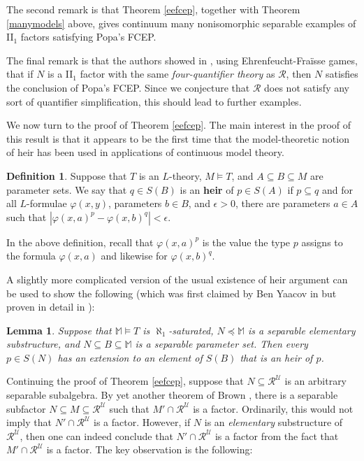 \documentclass[12pt]{amsart}
\newtheorem{lem}[thm]{Lemma}
\theoremstyle{definition}
\newtheorem{defn}[thm]{Definition}
\def\bb{\mathbb}
\def\bb{\mathbb}
\def\u{\mathsf 1}
\def \R{\mathcal R}
\def \u{\mathcal U}
\begin{document}
The second remark is that Theorem \ref{eefcep}, together with Theorem \ref{manymodels} above, gives continuum many nonisomorphic separable examples of II$_1$ factors satisfying Popa's FCEP.

The final remark is that the authors showed in \cite{few}, using Ehrenfeucht-Fra\"isse games, that if $N$ is a II$_1$ factor with the same \emph{four-quantifier theory} as $\R$, then $N$ satisfies the conclusion of Popa's FCEP.  Since we conjecture that $\R$ does not satisfy any sort of quantifier simplification, this should lead to further examples.

We now turn to the proof of Theorem \ref{eefcep}.  The main interest in the proof of this result is that it appears to be the first time that the model-theoretic notion of heir has been used in applications of continuous model theory.

\begin{defn}
Suppose that $T$ is an $L$-theory, $M\models T$, and $A\subseteq B\subseteq M$ are parameter sets.  We say that $q\in S(B)$ is an \textbf{heir} of $p\in S(A)$ if $p\subseteq q$ and for all $L$-formulae $\varphi(x,y)$, parameters $b\in B$, and $\epsilon>0$, there are parameters $a\in A$ such that $|\varphi(x,a)^p-\varphi(x,b)^q|<\epsilon$.
\end{defn}

In the above definition, recall that $\varphi(x,a)^p$ is the value the type $p$ assigns to the formula $\varphi(x,a)$ and likewise for $\varphi(x,b)^q$.

A slightly more complicated version of the usual existence of heir argument can be used to show the following (which was first claimed by Ben Yaacov in \cite{ben} but proven in detail in \cite[Fact 2.2.6]{AGK}):

\begin{lem}
Suppose that $\bb M\models T$ is $\aleph_1$-saturated, $N\preceq \bb M$ is a separable elementary substructure, and $N\subseteq B\subseteq \bb M$ is a separable parameter set.  Then every $p\in S(N)$ has an extension to an element of $S(B)$ that is an heir of $p$. 
\end{lem}

Continuing the proof of Theorem \ref{eefcep}, suppose that $N\subseteq \R^\u$ is an arbitrary separable subalgebra.  By yet another theorem of Brown \cite[Theorem 6.9]{nate}, there is a separable subfactor $N\subseteq M\subseteq \R^\u$ such that $M'\cap \R^\u$ is a factor.  Ordinarily, this would not imply that $N'\cap \R^\u$ is a factor.  However, if $N$ is an \emph{elementary} substructure of $\R^\u$, then one can indeed conclude that $N'\cap \R^\u$ is a factor from the fact that $M'\cap \R^\u$ is a factor.  The key observation is the following:
\end{document}
